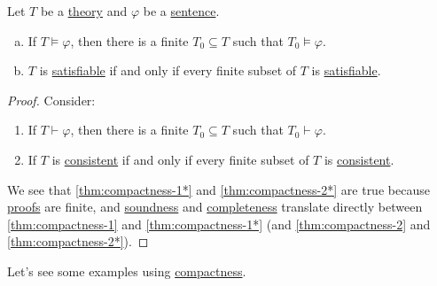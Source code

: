\begin{theorem}[Compactness]\label{thm:compactness}
	Let \(T\) be a \hyperref[def:theory]{theory} and \(\varphi \) be a \hyperref[def:sentence]{sentence}.
	\begin{enumerate}[(a)]
		\item\label{thm:compactness-1} If \(T\models \varphi \), then there is a finite \(T_0 \subseteq T\) such that \(T_0 \models \varphi \).
		\item\label{thm:compactness-2} \(T\) is \hyperref[def:satisfiable]{satisfiable} if and only if every finite subset of \(T\) is \hyperref[def:satisfiable]{satisfiable}.
	\end{enumerate}
\end{theorem}
\begin{proof}
	Consider:
	\begin{enumerate}[(a*)]
		\item\label{thm:compactness-1*} If \(T\vdash \varphi \), then there is a finite \(T_0 \subseteq T\) such that \(T_0 \vdash \varphi \).
		\item\label{thm:compactness-2*} If \(T\) is \hyperref[def:consistent]{consistent} if and only if every finite subset of \(T\) is \hyperref[def:consistent]{consistent}.
	\end{enumerate}
	We see that \autoref{thm:compactness-1*} and \autoref{thm:compactness-2*} are true because \hyperref[def:proof]{proofs} are finite, and \hyperref[thm:soundness]{soundness} and \hyperref[thm:completeness]{completeness} translate directly between \autoref{thm:compactness-1} and \autoref{thm:compactness-1*} (and \autoref{thm:compactness-2} and \autoref{thm:compactness-2*}).
\end{proof}

Let's see some examples using \hyperref[thm:compactness]{compactness}.

